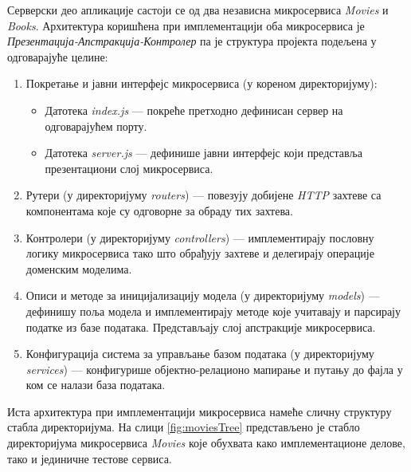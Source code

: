 \documentclass[12pt,oneside]{memoir}
\begin{document}
Серверски део апликације састоји се од два независна микросервиса \textit{Movies} и \textit{Books}. Архитектура коришћена при имплементацији оба микросервиса је \textit{Презентација-Апстракција-Контролер} па је структура пројекта подељена у одговарајуће целине:
\begin{enumerate}
\item Покретање и јавни интерфејс микросервиса (у кореном директоријуму):
\begin{itemize}
\item Датотека \textit{index.js} --- покреће претходно дефинисан сервер на одговарајућем порту.
\item Датотека \textit{server.js} --- дефинише јавни интерфејс који представља презентациони слој микросервиса.
\end{itemize}
\item Рутери (у директоријуму \textit{routers}) --- повезују добијене \textit{HTTP} захтеве са компонентама које су одговорне за обраду тих захтева.
\item Контролери (у директоријуму \textit{controllers}) --- имплементирају пословну логику микросервиса тако што обрађују захтеве и делегирају операције доменским моделима.
\item Описи и методе за иницијализацију модела (у директоријуму \textit{models}) ---  дефинишу поља модела и имплементирају методе које учитавају и парсирају податке из базе података. Представљају слој апстракције микросервиса.
\item Конфигурација  система за управљање базом података (у директоријуму \textit{services}) --- конфигурише објектно-релационо мапирање и путању до фајла у ком се налази база података.
\end{enumerate}

Иста архитектура при имплементацији микросервиса намеће сличну структуру стабла директоријума. На слици \ref{fig:moviesTree} представљено је стабло директоријума микросервиса \textit{Movies} које обухвата како имплементационе делове, тако и јединичне тестове сервиса.
\end{document}
